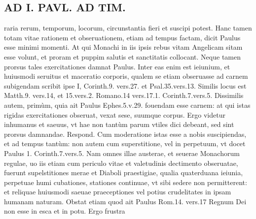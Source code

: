 \documentclass{article}
\begin{document}
\begin{pages}
\section*{AD I. PAVL. AD TIM. }
\marginpar{[ p.210 ]}\pstart raria rerum, temporum, locorum, circunstantia fieri et suscipi potest.  \pend\pstart Hanc tamen totam vitae rationem et obseruationem, etiam ad tempus factam, dicit Paulus esse minimi momenti. At qui Monachi in iis ipsis rebus vitam Angelicam sitam esse volunt, et proram et puppim salutis et sanctitatis collocant.  \pend\pstart Neque tamen prorsus tales exercitationes damnat Paulus. Inter eas enim est ieiunium, et huiusmodi seruitus et maceratio corporis, qualem se etiam obseruasse ad carnem subigendam scribit ipse I, Corinth.9. vers.27. et Psal.35.vers.13. Similis locus est Matth.9. vers.14, et 15.vers.2. Romano.14 vers.17.1. Corinth.7.vers.5. Dissimilis autem, primùm, quia ait Paulus Ephes.5.v.29. fouendam esse carnem: at qui istas rigidas exercitationes obseruat, vexat sese, suumque corpus. Ergo videtur inhumanus et saeuus, vt hae non tantùm parum vtiles dici debeant, sed sint prorsus damnandae. Respond. Cum moderatione istas esse a nobis suscipiendas, et ad tempus tantùm: non autem cum superstitione, vel in perpetuum, vt docet Paulus 1. Corinth.7.vers.5. Nam omnes illae austerae, et seuerae Monachorum regulae, uo iis etiam cum periculo vitae et valetudinis dectimento obseruatae, fuerunt supelstitiones merae et Diaboli praestigiae, qualia quaterduana ieiunia, perpetuae humi cubationes, stationes continuae, vt sibi sedere non permitterent: et reliquae huiusmodi saeuae praeceptiones vel potius crudelitates in ipsam humanam naturam. Obstat etiam quod ait Paulus Rom.14. vers.17  \pend\pstart Regnum Dei non esse in esca et in potu. Ergo frustra  \pend

\end{pages}
\end{document}
